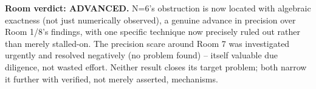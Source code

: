 \documentclass[11pt]{article}
\begin{document}
\textbf{Room verdict: ADVANCED.} N=6's obstruction is now located with algebraic exactness (not
just numerically observed), a genuine advance in precision over Room 1/8's findings, with one
specific technique now precisely ruled out rather than merely stalled-on. The precision scare
around Room 7 was investigated urgently and resolved negatively (no problem found) -- itself
valuable due diligence, not wasted effort. Neither result closes its target problem; both narrow
it further with verified, not merely asserted, mechanisms.
\end{document}
